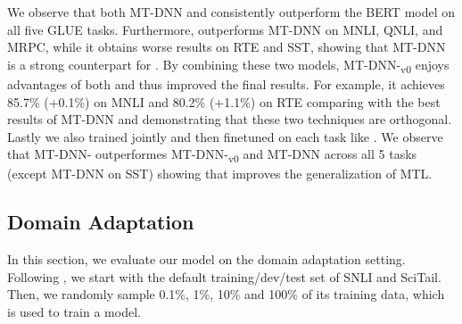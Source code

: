 We observe that both MT-DNN and {\model} consistently outperform the BERT model on all five GLUE tasks. Furthermore, {\model} outperforms MT-DNN on MNLI, QNLI, and MRPC, while it obtains worse results on RTE and SST, showing that MT-DNN is a strong counterpart for {\model}. By combining these two models, MT-DNN-{\model}\textsubscript{v0} enjoys advantages of both and thus improved the final results. For example, it achieves 85.7\% (+0.1\%) on MNLI and 80.2\% (+1.1\%) on RTE comparing with the best results of MT-DNN and {\model} demonstrating that these two techniques are orthogonal. Lastly we also trained {\model} jointly and then finetuned on each task like \citet{liu2019mt-dnn}. We observe that MT-DNN-{\model} outperformes MT-DNN-{\model}\textsubscript{v0} and MT-DNN across all 5 tasks (except MT-DNN on SST) showing that {\model} improves the generalization of MTL.

\subsection{Domain Adaptation}
\label{subsec:domain}


In this section, we evaluate our model on the domain adaptation setting. Following \citet{liu2019mt-dnn}, we start with the default training/dev/test set of SNLI and SciTail. Then, we randomly sample 0.1\%, 1\%, 10\% and 100\% of its training data, which is used to train a model. 

